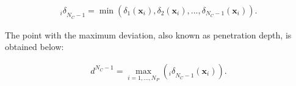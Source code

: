 




\begin{equation}
\begin{aligned}
{_i\delta}_{N_C-1} = \min \left ( \delta_{1}(\textbf{x}_i),\delta_{2}(\textbf{x}_i),...,\delta_{N_C-1}(\textbf{x}_i) \right ) \mbox{.}
\end{aligned}
\label{eqt:dev_min}
\end{equation}

The point with the maximum deviation, also known as penetration depth, is obtained below:

\begin{equation}
\begin{aligned}
d^{N_C-1} = \max_{i=1,...,N_P} \left ( {_i\delta}_{N_C-1}(\textbf{x}_i) \right ) \mbox{.}
\end{aligned}
\label{eqt:dev_max}
\end{equation}



